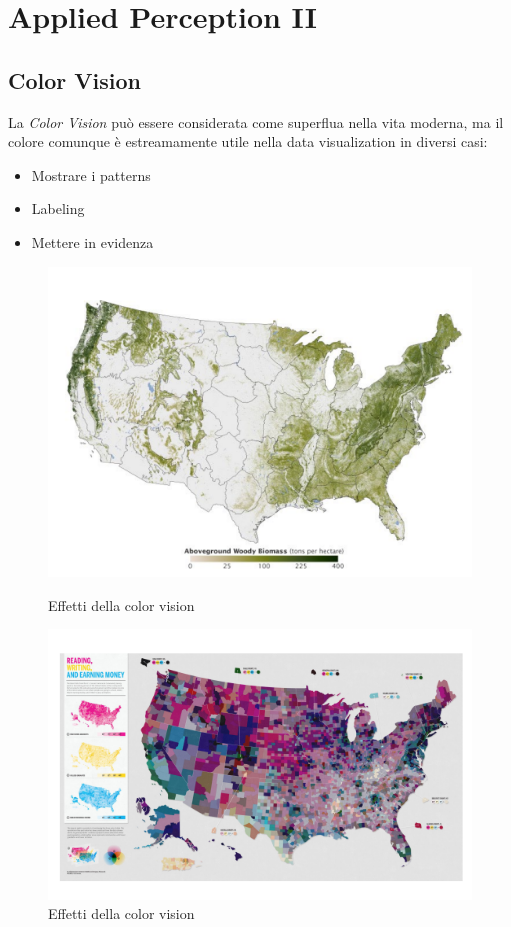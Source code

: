 \section{Applied Perception II }
\subsection{Color Vision}
La \textit{Color Vision} può essere considerata come superflua nella vita moderna, ma il colore comunque è estreamamente utile nella data visualization in diversi casi:
\begin{itemize}
    \item Mostrare i patterns
    \item Labeling
    \item Mettere in evidenza
\end{itemize}
\begin{figure}[H]
    \centering
    \begin{minipage}{0.45\textwidth}
        \centering
        \includegraphics[width=\linewidth]{images/ColorVision.png} 
        \caption{Effetti della color vision}
        \label{fig:immagine1}
    \end{minipage}\hfill
    \begin{minipage}{0.45\textwidth}
        \centering
        \includegraphics[width=\linewidth]{images/ColorVision2.png} 
        \caption{Effetti della color vision}
        \label{fig:immagine2}
    \end{minipage}
\end{figure}
